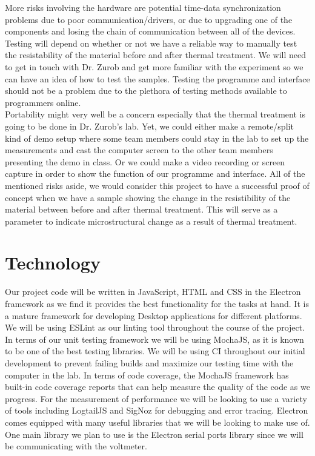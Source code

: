 \documentclass{article}
\begin{document}
\noindent More risks involving the hardware are potential time-data synchronization problems due to poor communication/drivers, or due to upgrading one of the components and losing the chain of communication between all of the devices. 
Testing will depend on whether or not we have a reliable way to manually test the resistability of the material before and after thermal treatment. We will need to get in touch with Dr. Zurob and get more familiar with the experiment so we can have an idea of how to test the samples. Testing the programme and interface should not be a problem due to the plethora of testing methods available to programmers online. \\

\noindent Portability might very well be a concern especially that the thermal treatment is going to be done in Dr. Zurob's lab. Yet, we could either make a remote/split kind of demo setup where some team members could stay in the lab to set up the measurements and cast the computer screen to the other team members presenting the demo in class. Or we could make a video recording or screen capture in order to show the function of our programme and interface. 
\noindent All of the mentioned risks aside, we would consider this project to have a successful proof of concept when we have a sample showing the change in the resistibility of the material between before and after thermal treatment. This will serve as a parameter to indicate microstructural change as a result of thermal treatment.

\section{Technology}


Our project code will be written in JavaScript, HTML and CSS in the Electron framework as 
we find it provides the best functionality for the tasks at hand. It is a mature framework for developing Desktop applications for different platforms.
We will be using ESLint as our linting tool throughout the course of the project. In terms of our unit testing 
framework we will be using MochaJS, as it is known to be one of the best testing libraries. 
We will be using CI throughout our initial development to prevent failing builds and maximize our testing time with the computer in the lab. In terms of code coverage, the MochaJS 
framework has built-in code coverage reports that can help measure the quality of the code as we progress. For the
measurement of performance we will be looking to use a variety of tools including LogtailJS and SigNoz 
for debugging and error tracing. Electron comes equipped with many useful libraries that we 
will be looking to make use of. One main library we plan to use is the Electron serial ports library since we will be communicating with the voltmeter.
  
\end{document}
